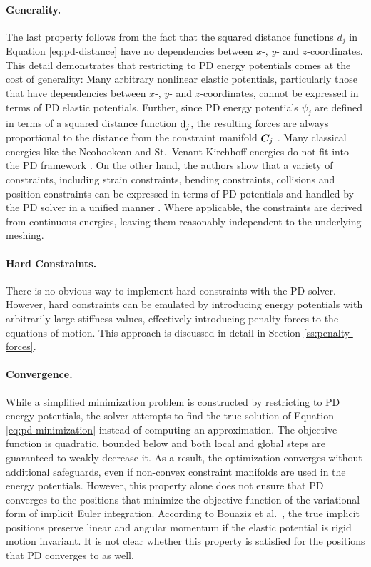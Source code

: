 \paragraph{Generality.}
The last property follows from the fact that the squared distance functions $d_j$ in Equation \ref{eq:pd-distance} have no dependencies between 
$x$-, $y$- and $z$-coordinates. This detail demonstrates that restricting to PD energy potentials comes at the cost of generality: 
Many arbitrary nonlinear elastic potentials, particularly those that have dependencies between $x$-, $y$- and $z$-coordinates, cannot be expressed 
in terms of PD elastic potentials. Further, since PD energy potentials $\psi_j$ are defined in terms of a squared distance function $\mathrm{d}_j$, the 
resulting forces are always proportional to the distance from the constraint manifold $\bm{C}_j$ \cite{overby2017}. Many classical energies 
like the Neohookean and St.\ Venant-Kirchhoff energies do not fit into the PD framework \cite{liu2017}.  On the other hand, the authors show that 
a variety of constraints, including strain constraints, bending constraints, collisions and position constraints can be expressed in terms of PD 
potentials and handled by the PD solver in a unified manner \cite{bouaziz2014}. Where applicable, the constraints are derived from continuous 
energies, leaving them reasonably independent to the underlying meshing.

\paragraph{Hard Constraints.}
There is no obvious way to implement hard constraints with the PD solver. However, hard constraints can be emulated by introducing energy potentials 
with arbitrarily large stiffness values, effectively introducing penalty forces to the equations of motion. This approach is discussed in detail in 
Section \ref{ss:penalty-forces}.

\paragraph{Convergence.}
While a simplified minimization problem is constructed by restricting to PD energy potentials, the solver attempts to find the 
true solution of Equation \ref{eq:pd-minimization} instead of computing an approximation. The objective function is quadratic, bounded below 
and both local and global steps are guaranteed to weakly decrease it. As a result, the optimization converges without additional 
safeguards, even if non-convex constraint manifolds are used in the energy potentials. However, this property alone does not ensure that 
PD converges to the positions that minimize the objective function of the variational form of implicit Euler integration. 
According to Bouaziz et al.\ \cite{bouaziz2014}, the true implicit positions preserve linear and angular momentum if the elastic potential 
is rigid motion invariant. It is not clear whether this property is satisfied for the positions that PD converges to as well.

